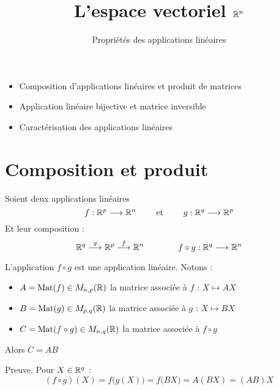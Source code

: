 








\title{{\bf L'espace vectoriel $\mathbb{R}^n$}}
\subtitle{Propriétés des applications linéaires}

\begin{frame}
  
  \debutmontitre

  \pause

{\footnotesize
\hfill
{}
\begin{minipage}{0.6\textwidth}
  \begin{itemize}
    \item<3-> Composition d'applications linéaires et produit de matrices
    \item<4-> Application linéaire bijective et matrice inversible
    \item<5-> Caractérisation des applications linéaires
  \end{itemize}
\end{minipage}
}

\end{frame}

\setcounter{framenumber}{0}


\section{Composition et produit}

\begin{frame}
Soient deux applications linéaires
$$f : \mathbb{R}^p \longrightarrow \mathbb{R}^n \qquad \text{ et } \qquad g : \mathbb{R}^q \longrightarrow \mathbb{R}^p$$
\pause
Et leur composition :
$$\mathbb{R}^q \overset{g}{\longrightarrow} \mathbb{R}^p\overset{f}{\longrightarrow} \mathbb{R}^n
 \qquad \qquad
f \circ g :  \mathbb{R}^q \longrightarrow \mathbb{R}^n
$$

\pause

L'application $f \circ g$ est une application linéaire.
\pause
Notons : 
\begin{itemize}
  \item $A = \mathop{\text{Mat}}\nolimits(f) \in M_{n,p}(\mathbb{R})$ la matrice associée à $f$ : $X \mapsto AX$
  \pause
  \item $B = \mathop{\text{Mat}}\nolimits(g) \in M_{p,q}(\mathbb{R})$ la matrice associée à $g$ : $X \mapsto BX$
  \pause
  \item $C = \mathop{\text{Mat}}\nolimits(f \circ g) \in M_{n,q}(\mathbb{R})$ la matrice associée à $f \circ g$
\end{itemize}
\pause
Alors $C = AB$
\pause
{}

\pause
Preuve. Pour $X \in \mathbb{R}^q$ :
$$(f \circ g)(X)  =  f \big(g(X)\big) = f\big( BX \big) = A(BX) = (AB)X$$

\end{frame}


